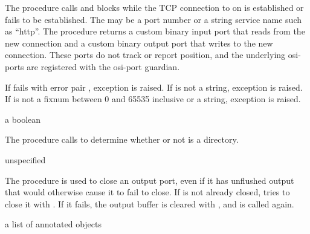 The  procedure calls  and
blocks while the TCP connection to  on 
is established or fails to be established.  The  may be
a port number or a string service name such as ``http''. The procedure
returns a custom binary input port that reads from the new connection
and a custom binary output port that writes to the new
connection. These ports do not track or report position, and the
underlying osi-ports are registered with the osi-port
guardian.


If  fails with error pair , exception  is
raised.  If  is not a string, exception  is raised. If  is not a
fixnum between 0 and 65535 inclusive or a string, exception
 is raised.

\begin{procedure}
\end{procedure}
\returns{} a boolean

The  procedure calls  to
determine whether or not  is a directory.

\begin{procedure}
\end{procedure}
\returns{} unspecified

The  procedure is used to close an
output port, even if it has unflushed output that would otherwise
cause it to fail to close.  If  is not already closed,
 tries to close it with
. If it fails, the output buffer is
cleared with , and
 is called again.

\begin{procedure}
\end{procedure}
\returns{} a list of annotated objects

